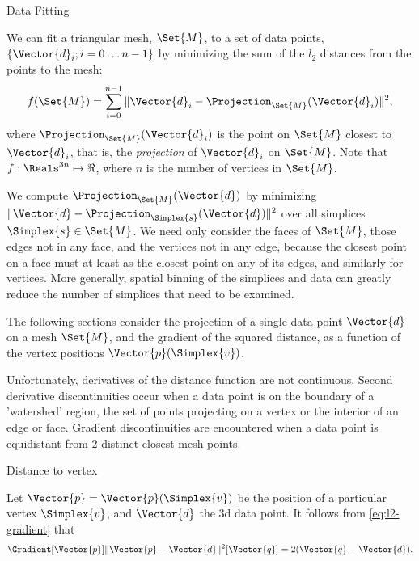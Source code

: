 \begin{plSection}{Data Fitting}
\label{sec:data-fitting}

We can fit a triangular mesh, $\Set{M}$, to a set of data points, 
$\{\Vector{d}_i; i=0 \ldots n-1\}$
by minimizing the sum of the $l_2$ distances from the points to the mesh:
\begin{equation}
f(\Set{M}) = \sum_{i=0}^{n-1} 
\| \Vector{d}_i - \Projection_\Set{M} (\Vector{d}_i) \|^2 ,
\end{equation}
where $\Projection_\Set{M} (\Vector{d}_i)$ 
is the point on $\Set{M}$ closest to $\Vector{d}_i$,
that is, the {\em projection} of $\Vector{d}_i$ on $\Set{M}$.
Note that $f:\Reals^{3n} \mapsto \Re$,
where $n$ is the number of vertices in $\Set{M}$.

We compute $\Projection_\Set{M} (\Vector{d})$ by minimizing  
$\| \Vector{d} - \Projection_\Simplex{s} (\Vector{d}) \|^2$
over all simplices $\Simplex{s} \in \Set{M}$.
We need only consider the faces of $\Set{M}$,
those edges not in any face,
and the vertices not in any edge,
because the closest point on a face must at least
as the closest point on any of its edges,
and similarly for vertices.
More generally, spatial binning of the simplices and data can greatly
reduce the number of simplices that need to be examined.

The following sections consider the projection of a single
data point $\Vector{d}$ on a mesh $\Set{M}$,
and the gradient of the squared distance,
as a function of the vertex positions $\Vector{p}(\Simplex{v})$.

Unfortunately, derivatives of the distance function are not continuous.
Second derivative discontinuities occur
when a data point is on the boundary
of a 'watershed' region, the set of points
projecting on a vertex or the interior of an edge or face.
Gradient discontinuities are encountered
when a data point is equidistant from 2 distinct closest mesh points.

\begin{plSection}{Distance to vertex}
\label{sec:Distance-to-vertex}

Let $\Vector{p} = \Vector{p}(\Simplex{v})$ 
be the position of a particular vertex $\Simplex{v}$,
and $\Vector{d}$ the 3d data point.
It follows from \cref{eq:l2-gradient} that
\begin{equation}
\label{eq:vertex-distance-gradient}
\Gradient[\Vector{p}]{\| \Vector{p} - \Vector{d} \|^2}[\Vector{q}] 
= 2 ( \Vector{q} - \Vector{d} ).
\end{equation}


\end{plSection}
\end{plSection}
